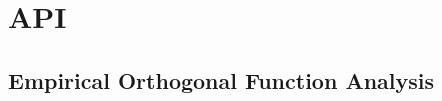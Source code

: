 \documentclass[letterpaper,10pt,english]{sphinxmanual}
\begin{document}
\section{API}
\label{\detokenize{stochprop:api}}\label{\detokenize{stochprop:id1}}\label{\detokenize{stochprop::doc}}

\subsection{Empirical Orthogonal Function Analysis}
\label{\detokenize{stochprop.eofs:module-stochprop.eofs}}\label{\detokenize{stochprop.eofs:empirical-orthogonal-function-analysis}}\label{\detokenize{stochprop.eofs::doc}}
\end{document}
